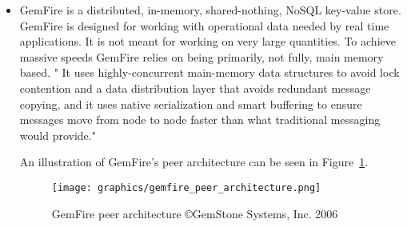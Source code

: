 \documentclass[letterpaper, 11pt]{article}
\begin{document}
\begin{itemize}
  \item GemFire is a distributed, in-memory, shared-nothing, NoSQL key-value store.
  GemFire is designed for working with operational data needed by real time
  applications. It is not meant for working on very large quantities. To
  achieve massive speeds GemFire relies on being primarily, not fully,
  main memory based. " It uses highly-concurrent main-memory data structures to avoid
  lock contention and a data distribution
  layer that avoids redundant message copying, and it uses native serialization and
  smart buffering to ensure messages move from node to node faster than what
  traditional messaging would provide."\cite{gemfire}
  \par\vspace{\baselineskip}
  An illustration of GemFire's peer architecture can be seen in Figure~\ref{fig:gemfire_peer}.
  \begin{figure}
  	\centering
  	\texttt{[image: graphics/gemfire\_peer\_architecture.png]}
  	\caption{GemFire peer architecture \newline \copyright GemStone Systems, Inc. 2006 \cite{gemfire}}
  	\label{fig:gemfire_peer}
  \end{figure}
  \par\vspace{\baselineskip}


\end{itemize}
\end{document}
